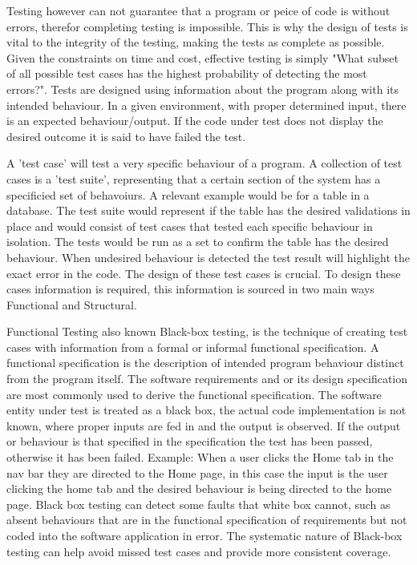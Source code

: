 \documentclass[a4paper,12pt]{article}
\begin{document}
\vspace{5mm}
\par Testing however can not guarantee that a program or peice of code is without errors, therefor completing testing is impossible. This is why the design of tests is vital to the integrity of the testing, making the tests as complete as possible. Given the constraints on time and cost, effective testing is simply "What subset of all possible test cases has the highest probability of detecting the most errors?"\cite{myers2011art}. Tests are designed using information about the program along with its intended behaviour. In a given environment, with proper determined input, there is an expected behaviour/output. If the code under test does not display the desired outcome it is said to have failed the test. 
\vspace{5mm}
\par A 'test case' will test a very specific behaviour of a program. A collection of test cases is a 'test suite', representing that a certain section of the system has a specificied set of behavoiurs. A relevant example would be for a table in a database. The test suite would represent if the table has the desired validations in place and would consist of test cases that tested each specific behaviour in isolation. The tests would be run as a set to confirm the table has the desired behaviour. When undesired behaviour is detected the test result will highlight the exact error in the code. The design of these test cases is crucial. To design these cases information is required, this information is sourced in two main ways Functional and Structural.
\vspace{5mm}
\par  Functional Testing also known Black-box testing, is the technique of creating test cases with information from a formal or informal functional specification. A functional specification is the description of intended program behaviour distinct from the program itself. The software requirements and or its design specification are most commonly used to derive the functional specification. The software entity under test is treated as a black box, the actual code implementation is not known, where proper inputs are fed in and the output is observed. If the output or behaviour is that specified in the specification the test has been passed, otherwise it has been failed. Example: When a user clicks the Home tab in the nav bar they are directed to the Home page, in this case the input is the user clicking the home tab and the desired behaviour is being directed to the home page. Black box testing can detect some faults that white box cannot, such as absent behaviours that are in the functional specification of requirements but not coded into the software application in error. The systematic nature of Black-box testing can help avoid missed test cases and provide more consistent coverage.\cite{nidhra2012blackbox}\cite{young2008software}
\end{document}
